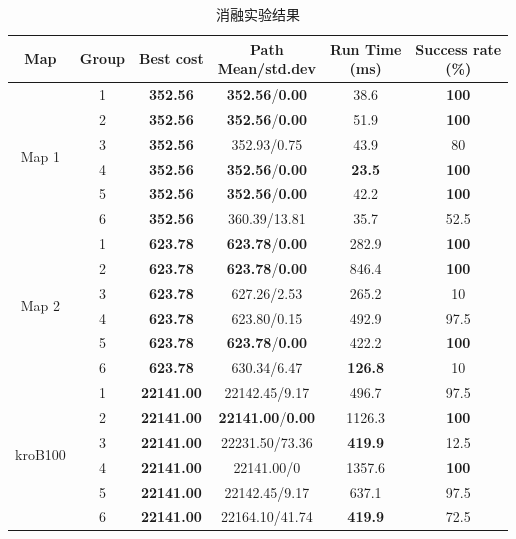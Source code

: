 \documentclass[lettersize,journal]{IEEEtran}
\begin{document}
\begin{table}[!t]
\caption{消融实验结果}
\label{tab:ablation}
\centering
\footnotesize
\setlength{\tabcolsep}{2.5pt}
\begin{tabular}{cccccc}
\toprule
Map & Group & Best cost & \makecell{Path\\Mean/std.dev} & \makecell{Run Time\\(ms)} & \makecell{Success rate\\(\%)} \\
\midrule
 \multirow{6}{*}{Map 1} & 1 & \textbf{352.56} & \textbf{352.56}/\textbf{0.00} & 38.6 & \textbf{100} \\
   & 2 & \textbf{352.56} & \textbf{352.56}/\textbf{0.00} & 51.9 & \textbf{100} \\
   & 3 & \textbf{352.56} & 352.93/0.75 & 43.9 & 80 \\
   & 4 & \textbf{352.56} & \textbf{352.56}/\textbf{0.00} & \textbf{23.5} & \textbf{100} \\
   & 5 & \textbf{352.56} & \textbf{352.56}/\textbf{0.00} & 42.2 & \textbf{100} \\
   & 6 & \textbf{352.56} & 360.39/13.81 & 35.7 & 52.5 \\
\midrule
 \multirow{6}{*}{Map 2} & 1 & \textbf{623.78} & \textbf{623.78}/\textbf{0.00} & 282.9 & \textbf{100} \\
   & 2 & \textbf{623.78} & \textbf{623.78}/\textbf{0.00} & 846.4 & \textbf{100} \\
   & 3 & \textbf{623.78} & 627.26/2.53 & 265.2 & 10 \\
   & 4 & \textbf{623.78} & 623.80/0.15 & 492.9 & 97.5 \\
   & 5 & \textbf{623.78} & \textbf{623.78}/\textbf{0.00} & 422.2 & \textbf{100} \\
   & 6 & \textbf{623.78} & 630.34/6.47 & \textbf{126.8} & 10 \\
\midrule
 \multirow{6}{*}{kroB100} & 1 & \textbf{22141.00} & 22142.45/9.17 & 496.7 & 97.5 \\
   & 2 & \textbf{22141.00} & \textbf{22141.00}/\textbf{0.00} & 1126.3 & \textbf{100} \\
   & 3 & \textbf{22141.00} & 22231.50/73.36 & \textbf{419.9} & 12.5 \\
   & 4 & \textbf{22141.00} & 22141.00/0 & 1357.6 & \textbf{100} \\
   & 5 & \textbf{22141.00} & 22142.45/9.17 & 637.1 & 97.5 \\
   & 6 & \textbf{22141.00} & 22164.10/41.74 & \textbf{419.9} & 72.5 \\
\bottomrule
\end{tabular}
\end{table}
\end{document}

